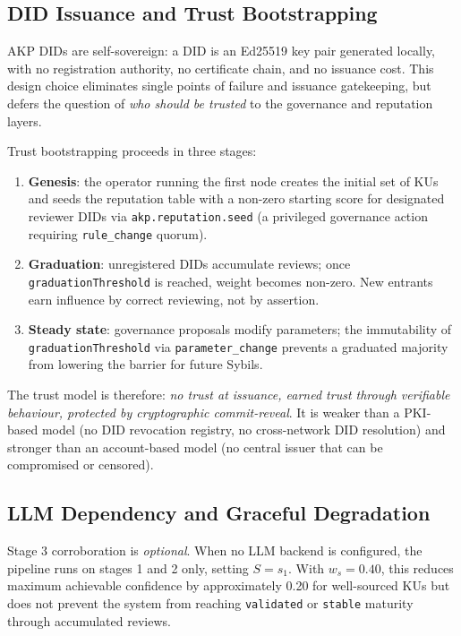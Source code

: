 \documentclass[10pt,twocolumn]{article}
\begin{document}
\subsection{DID Issuance and Trust Bootstrapping}

AKP DIDs are self-sovereign: a DID is an Ed25519 key pair generated locally,
with no registration authority, no certificate chain, and no issuance cost.
This design choice eliminates single points of failure and issuance
gatekeeping, but defers the question of \emph{who should be trusted} to
the governance and reputation layers.

Trust bootstrapping proceeds in three stages:
\begin{enumerate}[noitemsep,topsep=2pt]
  \item \textbf{Genesis}: the operator running the first node creates the
        initial set of KUs and seeds the reputation table with a non-zero
        starting score for designated reviewer DIDs via
        \texttt{akp.reputation.seed} (a privileged governance action
        requiring \texttt{rule\_change} quorum).
  \item \textbf{Graduation}: unregistered DIDs accumulate reviews;
        once \texttt{graduationThreshold} is reached, weight becomes
        non-zero. New entrants earn influence by correct reviewing, not
        by assertion.
  \item \textbf{Steady state}: governance proposals modify parameters;
        the immutability of \texttt{graduationThreshold} via
        \texttt{parameter\_change} prevents a graduated majority from
        lowering the barrier for future Sybils.
\end{enumerate}

The trust model is therefore: \emph{no trust at issuance, earned trust
through verifiable behaviour, protected by cryptographic commit-reveal}.
It is weaker than a PKI-based model (no DID revocation registry, no
cross-network DID resolution) and stronger than an account-based model
(no central issuer that can be compromised or censored).

\subsection{LLM Dependency and Graceful Degradation}

Stage 3 corroboration is \emph{optional}. When no LLM backend is configured,
the pipeline runs on stages 1 and 2 only, setting $S = s_1$. With $w_s =
0.40$, this reduces maximum achievable confidence by approximately 0.20 for
well-sourced KUs but does not prevent the system from reaching
\texttt{validated} or \texttt{stable} maturity through accumulated reviews.
\end{document}

